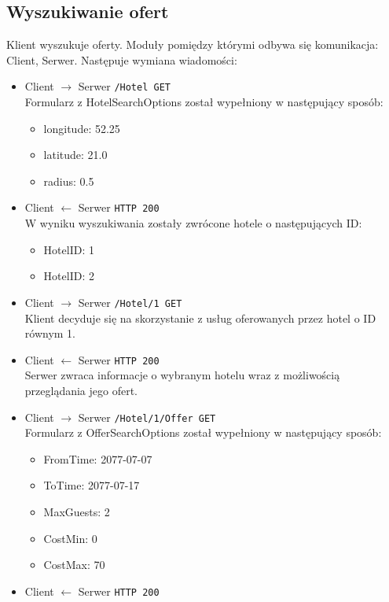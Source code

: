 \documentclass{article}
\begin{document}
\subsection{Wyszukiwanie ofert}
Klient wyszukuje oferty. Moduły pomiędzy którymi odbywa się komunikacja: Client, Serwer. 
Następuje wymiana wiadomości:
\begin{itemize}
    \item Client $\rightarrow$ Serwer \texttt{/Hotel GET}\\ 
    Formularz z HotelSearchOptions został wypełniony w następujący sposób:
    \begin{itemize}
        \item longitude: 52.25
        \item latitude: 21.0
        \item radius: 0.5
    \end{itemize}
    \item Client $\leftarrow$ Serwer \texttt{HTTP 200}\\
    W wyniku wyszukiwania zostały zwrócone hotele o następujących ID:
    \begin{itemize}
        \item HotelID: 1
        \item HotelID: 2
    \end{itemize}
    \item Client $\rightarrow$ Serwer \texttt{/Hotel/{1} GET}\\ 
    Klient decyduje się na skorzystanie z usług oferowanych przez hotel o ID równym 1.
    \item Client $\leftarrow$ Serwer \texttt{HTTP 200}\\ 
    Serwer zwraca informacje o wybranym hotelu wraz z możliwością przeglądania jego ofert.
    \item Client $\rightarrow$ Serwer \texttt{/Hotel/{1}/Offer GET}\\ 
    Formularz z OfferSearchOptions został wypełniony w następujący sposób:
    \begin{itemize}
        \item FromTime: 2077-07-07
        \item ToTime: 2077-07-17
        \item MaxGuests: 2
        \item CostMin: 0
        \item CostMax: 70
    \end{itemize}
    \item Client $\leftarrow$ Serwer \texttt{HTTP 200}\\ 

\end{itemize}
\end{document}
